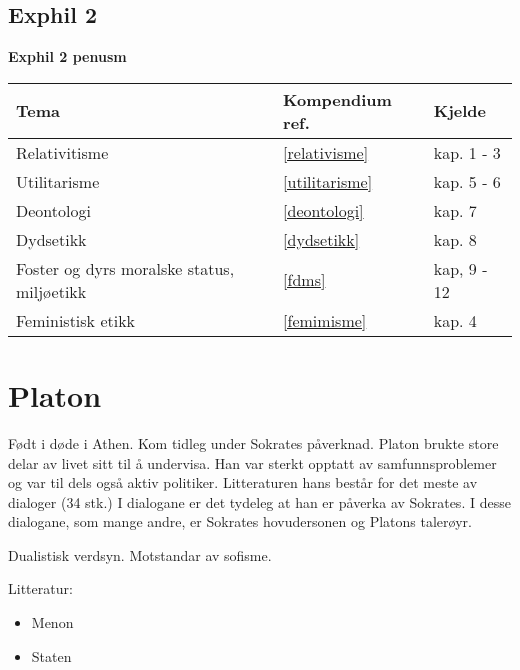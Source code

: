 \documentclass[a4paper]{IEEEtran}
\begin{document}
\subsection{Exphil 2}\bigskip
\begin{center}

\textbf{Exphil 2 penusm}\bigskip

\begin{tabularx}{0.75\textwidth}{| X | X | X |}\hline	  
            Tema
            &
            Kompendium ref.
            &
            Kjelde \\ \hline
            Relativitisme 
            &
            \ref{relativisme}
            &
            kap. 1 - 3
            \\ \hline
            Utilitarisme 
            &
            \ref{utilitarisme}
            &
            kap. 5 - 6
            \\ \hline
            Deontologi
            &
            \ref{deontologi}
            &
            kap. 7
            \\ \hline
            Dydsetikk 
            &
            \ref{dydsetikk}
            &
            kap. 8
            \\ \hline
            Foster og dyrs moralske status, miljøetikk 
            &
            \ref{fdms}
            & 
            kap, 9 - 12
            \\ \hline
            Feministisk etikk 
            &
            \ref{femimisme}
            & 
            kap. 4
            \\ \hline
    \end{tabularx}
\end{center}\clearpage
\twocolumn
\section{Platon}
\label{platon}\bigskip

Født i døde i Athen. Kom tidleg under Sokrates påverknad. Platon brukte store delar av livet sitt til å undervisa. Han var sterkt opptatt av samfunnsproblemer og var til dels også aktiv politiker. Litteraturen hans består for det meste av dialoger (34 stk.) I dialogane er det tydeleg at han er påverka av Sokrates. I desse dialogane, som mange andre, er Sokrates hovudersonen og Platons talerøyr.\bigskip

Dualistisk verdsyn. Motstandar av sofisme.\bigskip

Litteratur:
\begin{itemize}
    \item Menon
    \item Staten
\end{itemize}\bigskip 
\end{document}
